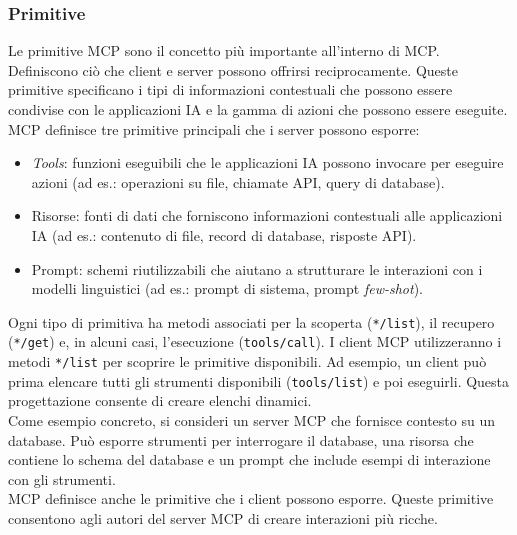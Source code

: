 \subsubsection{Primitive}
Le primitive MCP sono il concetto più importante all'interno di MCP. Definiscono ciò che client e server possono offrirsi reciprocamente. Queste primitive specificano i tipi di informazioni contestuali che possono essere condivise con le applicazioni IA e la gamma di azioni che possono essere eseguite.
MCP definisce tre primitive principali che i server possono esporre:
\begin{itemize}
\item \textit{Tools}: funzioni eseguibili che le applicazioni IA possono invocare per eseguire azioni (ad es.: operazioni su file, chiamate API, query di database).
\item Risorse: fonti di dati che forniscono informazioni contestuali alle applicazioni IA (ad es.: contenuto di file, record di database, risposte API).
\item Prompt: schemi riutilizzabili che aiutano a strutturare le interazioni con i modelli linguistici (ad es.: prompt di sistema, prompt \textit{few-shot}).
\end{itemize}
Ogni tipo di primitiva ha metodi associati per la scoperta (\texttt{*/list}), il recupero (\texttt{*/get}) e, in alcuni casi, l'esecuzione (\texttt{tools/call}). I client MCP utilizzeranno i metodi \texttt{*/list} per scoprire le primitive disponibili. Ad esempio, un client può prima elencare tutti gli strumenti disponibili (\texttt{tools/list}) e poi eseguirli. Questa progettazione consente di creare elenchi dinamici. \\
Come esempio concreto, si consideri un server MCP che fornisce contesto su un database. Può esporre strumenti per interrogare il database, una risorsa che contiene lo schema del database e un prompt che include esempi di interazione con gli strumenti. \\
MCP definisce anche le primitive che i client possono esporre. Queste primitive consentono agli autori del server MCP di creare interazioni più ricche.
